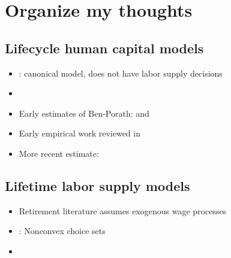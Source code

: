 \documentclass[12pt]{article}
\begin{document}
\iffalse
\section{Organize my thoughts}
\subsection{Lifecycle human capital models}
\begin{itemize}
    \item \textcite{ben-porath_1976_human_capital_lifecycle_earnings}: canonical model, does not have labor supply decisions
    \item \textcite{kuruscu_2006_lifecycle_training}
    \item Early estimates of Ben-Porath: \textcite{rosen_1976_lifecycle_human_capital} and \textcite{haley_1976_lifecycle_human_capital}
    \item Early empirical work reviewed in \textcite{browning_hansen_heckman_1999_micro_data_ge_models}
    \item More recent estimate: \textcite{kuruscu_2006_lifecycle_training}
\end{itemize}

\subsection{Lifetime labor supply models}
\begin{itemize}
    \item Retirement literature assumes exogenous wage processes
    \item \textcite{rogerson_wallenius_2013_retirement_nonconvexities}: Nonconvex choice sets
    \item 
\end{itemize}
\end{document}
